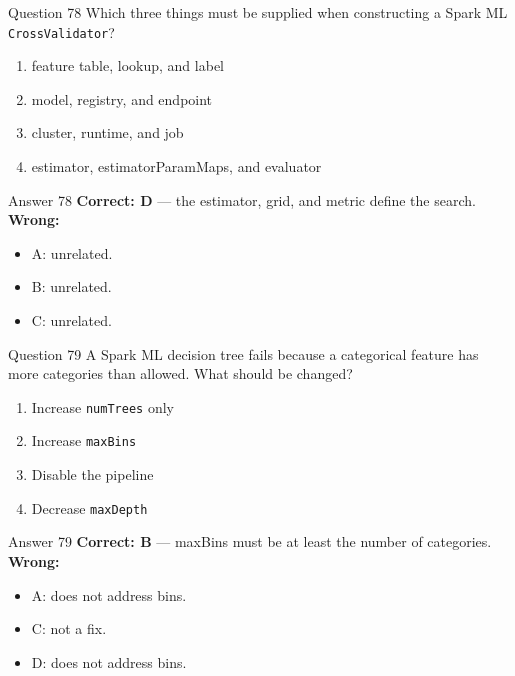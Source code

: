 \documentclass[aspectratio=169,11pt]{beamer}
\begin{document}
	\begin{frame}{Question 78}
		Which three things must be supplied when constructing a Spark ML \texttt{CrossValidator}?
		\begin{enumerate}[label=\Alph*.]
			\item feature table, lookup, and label
			\item model, registry, and endpoint
			\item cluster, runtime, and job
			\item estimator, estimatorParamMaps, and evaluator
		\end{enumerate}
	\end{frame}
	\begin{frame}{Answer 78}
		\textbf{Correct: D} --- the estimator, grid, and metric define the search.\\
		\vspace{0.5em}
		\textbf{Wrong:}
		\begin{itemize}
			\item A: unrelated.
			\item B: unrelated.
			\item C: unrelated.
		\end{itemize}
	\end{frame}
	
	\begin{frame}{Question 79}
		A Spark ML decision tree fails because a categorical feature has more categories than allowed. What should be changed?
		\begin{enumerate}[label=\Alph*.]
			\item Increase \texttt{numTrees} only
			\item Increase \texttt{maxBins}
			\item Disable the pipeline
			\item Decrease \texttt{maxDepth}
		\end{enumerate}
	\end{frame}
	\begin{frame}{Answer 79}
		\textbf{Correct: B} --- maxBins must be at least the number of categories.\\
		\vspace{0.5em}
		\textbf{Wrong:}
		\begin{itemize}
			\item A: does not address bins.
			\item C: not a fix.
			\item D: does not address bins.
		\end{itemize}
	\end{frame}
	
\end{document}
